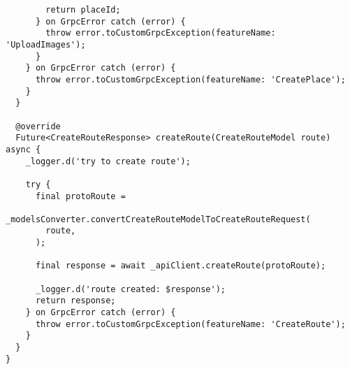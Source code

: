 \begin{verbatim}
        return placeId;
      } on GrpcError catch (error) {
        throw error.toCustomGrpcException(featureName: 'UploadImages');
      }
    } on GrpcError catch (error) {
      throw error.toCustomGrpcException(featureName: 'CreatePlace');
    }
  }

  @override
  Future<CreateRouteResponse> createRoute(CreateRouteModel route) async {
    _logger.d('try to create route');

    try {
      final protoRoute =
          _modelsConverter.convertCreateRouteModelToCreateRouteRequest(
        route,
      );

      final response = await _apiClient.createRoute(protoRoute);

      _logger.d('route created: $response');
      return response;
    } on GrpcError catch (error) {
      throw error.toCustomGrpcException(featureName: 'CreateRoute');
    }
  }
}
\end{verbatim}

